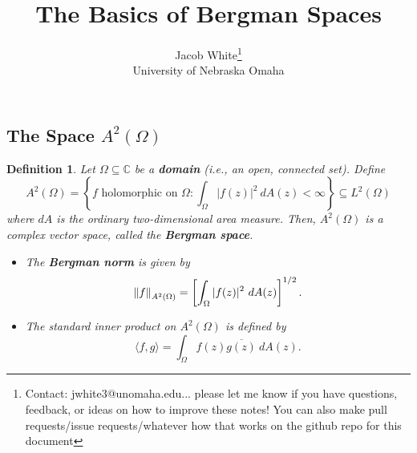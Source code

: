 \documentclass[10pt]{article}
\title{\textbf{The Basics of Bergman Spaces}}
\date{}
\author{Jacob White\footnote{Contact: jwhite3@unomaha.edu... please let me know if you have questions, feedback, or ideas on how to improve these notes! You can also make pull requests/issue requests/whatever how that works on the github repo for this document} \\ University of Nebraska Omaha}
\theoremstyle{plain}
\newtheorem{definition}{Definition}
\begin{document}
	\maketitle 
	

\subsection*{The Space $A^2(\Omega)$}

	\begin{definition}
		Let $\Omega \subseteq \mathbb{C}$ be a \textbf{\textit{domain}} (i.e., an open, connected set). Define $$A^2(\Omega) = \left\{f \text{ holomorphic on } \Omega: \int_\Omega |f(z)|^2 \ dA(z) < \infty\right\} \subseteq L^2(\Omega)$$ where $dA$ is the ordinary two-dimensional area measure. Then, $A^2(\Omega)$ is a complex vector space, called the \textbf{\textit{Bergman space}}. 
			\begin{itemize}
				\item The \textbf{\textit{Bergman norm}} is given by $$\norm{f}_{A^2(\Omega)} = \left[\int_\Omega |f(z)|^2  \ dA(z)\right]^{1/2}.$$
				
				\item The standard inner product on $A^2(\Omega)$ is defined by $$\langle f, g \rangle = \int_\Omega f(z) \overline{g(z)} \ dA(z).$$
			\end{itemize} 
	\end{definition}
\end{document}
